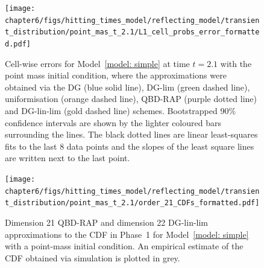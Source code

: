 \begin{figure}[h]
	\centering
	\texttt{[image: chapter6/figs/hitting\_times\_model/reflecting\_model/transient\_distribution/point\_mas\_t\_2.1/L1\_cell\_probs\_error\_formatted.pdf]}
	\caption{Cell-wise errors for Model~\ref{model: simple} at time \(t=2.1\) with the point mass initial condition, where the approximations were obtained via the DG (blue solid line), DG-lim (green dashed line), uniformisation (orange dashed line), QBD-RAP (purple dotted line) and DG-lin-lim (gold dashed line) schemes. Bootstrapped 90\% confidence intervals are shown by the lighter coloured bars surrounding the lines. The black dotted lines are linear least-squares fits to the last 8 data points and the slopes of the least square lines are written next to the last point.} 
	\label{fig: reflecting transient pm t2.1} 
\end{figure}
\begin{figure}[h]
	\centering
	\texttt{[image: chapter6/figs/hitting\_times\_model/reflecting\_model/transient\_distribution/point\_mas\_t\_2.1/order\_21\_CDFs\_formatted.pdf]}
	\caption{Dimension 21 QBD-RAP and dimension 22 DG-lin-lim approximations to the CDF in Phase~1 for Model~\ref{model: simple} with a point-mass initial condition. An empirical estimate of the CDF obtained via simulation is plotted in grey.}  
	\label{fig: reflecting transient pm t2.1 cdfs} 
\end{figure}

